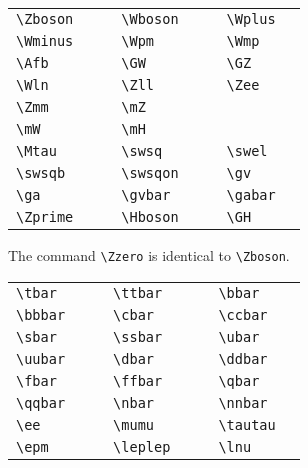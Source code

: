 \documentclass[11pt,a4paper]{cepcnote}
\begin{document}
\medskip

\begin{tabular}{llcllcll}
  \verb+\Zboson+ & \Zboson{} & \hspace{5mm} &
  \verb+\Wboson+ & \Wboson{} & \hspace{5mm} &
  \verb+\Wplus+ & \Wplus{} \\
  \verb+\Wminus+ & \Wminus{} & &
  \verb+\Wpm+ & \Wpm{} & &
  \verb+\Wmp+ & \Wmp{} \\
  \verb+\Afb+ & \Afb{} & &
  \verb+\GW+ & \GW{} & &
  \verb+\GZ+ & \GZ{} \\
  \verb+\Wln+ & \Wln{} & &
  \verb+\Zll+ & \Zll{} & &
  \verb+\Zee+ & \Zee{} \\
  \verb+\Zmm+ & \Zmm{} & &
  \verb+\mZ+ & \mZ{} \\
  \verb+\mW+ & \mW{} & &
  \verb+\mH+ & \mH{} \\
  \verb+\Mtau+ & \Mtau{} & &
  \verb+\swsq+ & \swsq{} & &
  \verb+\swel+ & \swel{} \\
  \verb+\swsqb+ &  \swsqb{} & &
  \verb+\swsqon+ & \swsqon{} & &
  \verb+\gv+ &  \gv{} \\
  \verb+\ga+ & \ga{} & &
  \verb+\gvbar+ & \gvbar{} & &
  \verb+\gabar+ & \gabar{} \\
  \verb+\Zprime+ & \Zprime{} & &
  \verb+\Hboson+ & \Hboson{} & & 
  \verb+\GH+ & \GH{} \\
\end{tabular}

\medskip

\noindent The command \verb+\Zzero+ is identical to \verb+\Zboson+.

\medskip

\begin{tabular}{llcllcll}
  \verb+\tbar+ & \tbar{} & \hspace{1cm} &
  \verb+\ttbar+ & \ttbar{} & \hspace{1cm} &
  \verb+\bbar+ & \bbar{} \\
  \verb+\bbbar+ & \bbbar{} & &
  \verb+\cbar+ & \cbar{} & &
  \verb+\ccbar+ & \ccbar{} \\
  \verb+\sbar+ & \sbar{} & &
  \verb+\ssbar+ &  \ssbar{} & &
  \verb+\ubar+ & \ubar{} \\
  \verb+\uubar+ & \uubar{} & &
  \verb+\dbar+ & \dbar{} & &
  \verb+\ddbar+ & \ddbar{} \\
  \verb+\fbar+ & \fbar{} & &
  \verb+\ffbar+ &  \ffbar{} & &
  \verb+\qbar+ & \qbar{} \\
  \verb+\qqbar+ & \qqbar{} & &
  \verb+\nbar+ & \nbar{} & &
  \verb+\nnbar+ & \nnbar{} \\
  \verb+\ee+ & \ee{} & &
  \verb+\mumu+ & \mumu{} & &
  \verb+\tautau+ & \tautau{} \\
  \verb+\epm+ & \epm{} & &
  \verb+\leplep+ & \leplep{} & & 
  \verb+\lnu+ & \lnu{} \\
\end{tabular}
\end{document}
